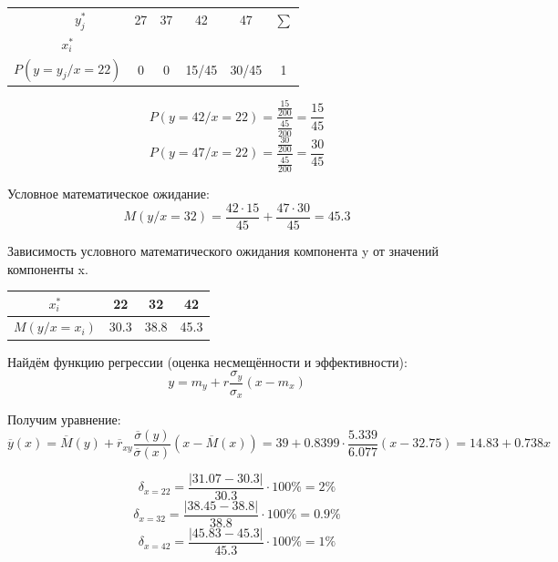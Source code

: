 \documentclass{article}
\begin{document}
\begin{table}[H]
    \centering
    \begin{tabular}{|c|c|c|c|c|c|}
    \hline
     \ \ \ \ $y_j^*$&  27&  37&  42& 47 & $\sum$\\
    $x_i^*$&  &  &  & &\\
    \hline
    $P(y=y_j / x = 22)$&  0&  0&  15/45& 30/45& 1\\
    \hline
    \end{tabular}
\end{table}

\[P(y=42 / x = 22) = \frac{\frac{15}{200}}{\frac{45}{200}} = \frac{15}{45}\]
\[P(y=47 / x = 22) = \frac{\frac{30}{200}}{\frac{45}{200}} = \frac{30}{45}\]

Условное математическое ожидание:
\[M(y/x=32) = \frac{42\cdot 15}{45} + \frac{47\cdot 30}{45} = 45.3\]

Зависимость условного математического ожидания компонента y от значений компоненты x.
\begin{table}[H]
    \centering
    \begin{tabular}{|c|c|c|c|}
    \hline
    $x_i^*$&  22&  32&  42\\
    \hline
    $M(y/x=x_i)$ &30.3& 38.8& 45.3\\
    \hline
    \end{tabular}
\end{table}

Найдём функцию регрессии (оценка несмещённости и эффективности):
\[y = m_y +r\frac{\sigma_y}{\sigma_x} (x-m_x)\]

Получим уравнение: 
\[\overline{y}(x) = \overline{M}(y)+\overline{r}_{xy}\frac{\overline{\sigma}(y)}{\overline{\sigma}(x)}(x-\overline{M}(x)) = 39 + 0.8399\cdot \frac{5.339}{6.077} (x-32.75) = 14.83+0.738x\]

\[\delta_{x=22} = \frac{|31.07 - 30.3|}{30.3} \cdot 100\% = 2\%\]
\[\delta_{x=32} = \frac{|38.45 - 38.8|}{38.8} \cdot 100\% = 0.9\%\]
\[\delta_{x=42} = \frac{|45.83 - 45.3|}{45.3} \cdot 100\% = 1\%\]
\end{document}
